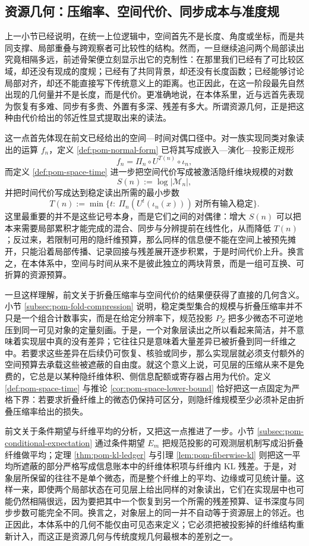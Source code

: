 \subsection{资源几何：压缩率、空间代价、同步成本与准度规}\label{subsec:physical-spacetime-skeleton-resource-geometry}

上一小节已经说明，在统一上位逻辑中，空间首先不是长度、角度或坐标，而是共同支撑、局部重叠与跨观察者可比较性的结构。然而，一旦继续追问两个局部读出究竟相隔多远，前述骨架便立刻显示出它的克制性：在那里我们已经有了可比较区域，却还没有现成的度规；已经有了共同背景，却还没有长度函数；已经能够讨论局部对齐，却还不能直接写下传统意义上的距离。也正因此，在这一阶段最先自然出现的几何量并不是长度，而是代价。更准确地说，在本体系里，近与远首先表现为恢复有多难、同步有多贵、外置有多深、残差有多大。所谓资源几何，正是把这种由代价给出的邻近性显式提取出来的读法。

这一点首先体现在前文已经给出的空间—时间对偶口径中。对一族实现同类对象读出的运算 \(f_n\)，定义 \ref{def:pom-normal-form} 已将其写成嵌入—演化—投影正规形
\[
f_n=\Pi_n\circ U^{T(n)}\circ \iota_n,
\]
而定义 \ref{def:pom-space-time} 进一步把空间代价写成被激活隐纤维块规模的对数
\[
S(n):=\log|\mathcal M_n|,
\]
并把时间代价写成达到稳定读出所需的最小步数
\[
T(n):=\min\{t:\ \Pi_n(U^t(\iota_n(x)))\ \text{对所有输入稳定}\}.
\]
这里最重要的并不是这些记号本身，而是它们之间的对偶律：增大 \(S(n)\) 可以把本来需要局部累积才能完成的混合、同步与分辨提前在线性化，从而降低 \(T(n)\)；反过来，若限制可用的隐纤维预算，那么同样的信息便不能在空间上被预先摊开，只能沿着局部传播、记录回接与残差展开逐步积累，于是时间代价上升。换言之，在本体系中，空间与时间从来不是彼此独立的两块背景，而是一组可互换、可折算的资源预算。

一旦这样理解，前文关于折叠压缩率与空间代价的结果便获得了直接的几何含义。小节 \ref{subsec:pom-fold-compression} 说明，稳定类型集合的规模与折叠压缩率并不只是一个组合计数事实，而是在给定分辨率下，规范投影 \(P_Z\) 把多少微态不可逆地压到同一可见对象的定量刻画。于是，一个对象层读出之所以看起来简洁，并不意味着实现层中真的没有差异；它往往只是意味着大量差异已被折叠到同一纤维之中。若要求这些差异在后续仍可恢复、核验或同步，那么实现层就必须支付额外的空间预算去承载这些被遮蔽的自由度。就这个意义上说，可见层的压缩从来不是免费的，它总是以某种隐纤维体积、侧信息配额或寄存器占用为代价。定义 \ref{def:pom-space-time} 与推论 \ref{cor:pom-space-lower-bound} 恰好把这一点固定为严格下界：若要求折叠纤维上的微态仍保持可区分，则隐纤维规模至少必须补足由折叠压缩率给出的损失。

前文关于条件期望与纤维平均的分析，又把这一点推进了一步。小节 \ref{subsec:pom-conditional-expectation} 通过条件期望 \(E_m\) 把规范投影的可观测层机制写成沿折叠纤维做平均；定理 \ref{thm:pom-kl-ledger} 与引理 \ref{lem:pom-fiberwise-kl} 则把这一平均所遮蔽的部分严格写成信息账本中的纤维体积项与纤维内 KL 残差。于是，对象层所保留的往往不是单个微态，而是整个纤维上的平均、边缘或可见统计量。这样一来，即使两个局部状态在可见层上给出同样的对象读出，它们在实现层中也可能仍然相隔很远，因为要把其中一个恢复到另一个所需的残差预算、证书深度与同步步数可能完全不同。换言之，对象层上的同一并不自动等于资源层上的邻近。也正因此，本体系中的几何不能仅由可见态来定义；它必须把被投影掉的纤维结构重新计入，而这正是资源几何与传统度规几何最根本的差别之一。

